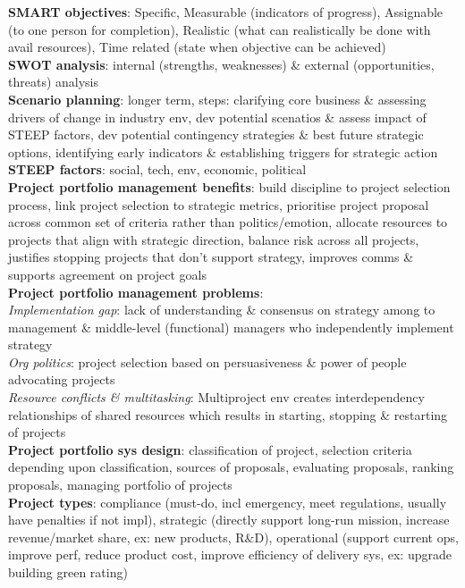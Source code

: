\documentclass[a4paper]{article}
\begin{document}
\begin{multicols}{3}
        \textbf{SMART objectives}: Specific, Measurable (indicators of progress), Assignable (to one person for completion), Realistic (what can realistically be done with avail resources), Time related (state when objective can be achieved)\\
        \textbf{SWOT analysis}: internal (strengths, weaknesses) \& external (opportunities, threats) analysis\\
        \textbf{Scenario planning}: longer term, steps: clarifying core business \& assessing drivers of change in industry env, dev potential scenatios \& assess impact of STEEP factors, dev potential contingency strategies \& best future strategic options, identifying early indicators \& establishing triggers for strategic action\\
        \textbf{STEEP factors}: social, tech, env, economic, political\\
        \textbf{Project portfolio management benefits}: build discipline to project selection process, link project selection to strategic metrics, prioritise project proposal across common set of criteria rather than politics/emotion, allocate resources to projects that align with strategic direction, balance risk across all projects, justifies stopping projects that don't support strategy, improves comms \& supports agreement on project goals\\
        \textbf{Project portfolio management problems}:\\
        \textit{Implementation gap}: lack of understanding \& consensus on strategy among to management \& middle-level (functional) managers who independently implement strategy\\
        \textit{Org politics}: project selection based on persuasiveness \& power of people advocating projects\\
        \textit{Resource conflicts \& multitasking}: Multiproject env creates interdependency relationships of shared resources which results in starting, stopping \& restarting of projects\\
        \textbf{Project portfolio sys design}: classification of project, selection criteria depending upon classification, sources of proposals, evaluating proposals, ranking proposals, managing portfolio of projects\\
        \textbf{Project types}: compliance (must-do, incl emergency, meet regulations, usually have penalties if not impl), strategic (directly support long-run mission, increase revenue/market share, ex: new products, R\&D), operational (support current ops, improve perf, reduce product cost, improve efficiency of delivery sys, ex: upgrade building green rating)\\

\end{multicols}
\end{document}
